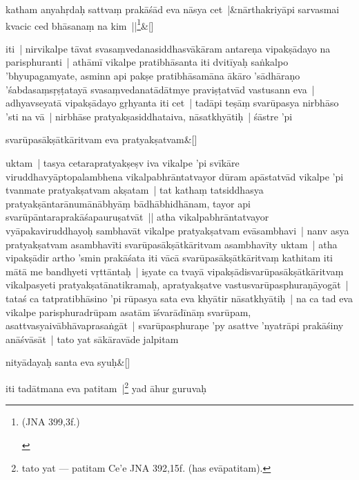 \documentclass[article,a4paper]{memoir}
\newcommand{\name}[1]{#1}
\begin{document}
	    
	    \stanza[\smallbreak]
katham anyahṛdaḥ sattvaṃ prakā\-śā\-d eva nā\-sya cet |&nā\-rthakriyā\-pi sarvasmai kvacic ced bhā\-sanaṃ na kim ||\footnote{\label{RNA-n-1}  \begin{english}(JNA 399,3f.)\end{english}}\&[\smallbreak]


	

	  \pstart iti | nirvikalpe tā\-vat svasaṃvedanasiddhasvā\-kā\-ram antareṇa vipakṣā\-dayo na parisphuranti | athā\-mī\- vikalpe pratibhā\-santa iti dvitī\-yaḥ saṅkalpo 'bhyupagamyate, asminn api pakṣe pratibhā\-samā\-na ā\-kā\-ro 'sā\-dhā\-raṇo 'śabdasaṃsṛṣṭatayā\- svasaṃvedanatā\-dā\-tmye praviṣṭatvā\-d vastusann eva | \label{thakur75-132.32} adhyavseyatā\- vipakṣā\-dayo gṛhyanta iti cet | tadā\-pi teṣā\-ṃ svarū\-pasya nirbhā\-so 'sti na vā\- | nirbhā\-se pratyakṣasiddhataiva, nā\-satkhyā\-tiḥ | śā\-stre 'pi
	\pend
      
	    
	    \stanza[\smallbreak]
svarū\-pasā\-kṣā\-tkā\-ritvam eva pratyakṣatvam\&[\smallbreak]


	

	  \pstart uktam | tasya cetarapratyakṣeṣv iva vikalpe 'pi svī\-kā\-re viruddhavyā\-ptopalambhena vikalpabhrā\-ntatvayor dū\-ram apā\-statvā\-d vikalpe 'pi tvanmate pratyakṣatvam akṣatam | tat kathaṃ tatsiddhasya pratyakṣā\-ntarā\-numā\-nā\-bhyā\-ṃ bā\-dhā\-bhidhā\-nam, tayor api svarū\-pā\-ntaraprakā\-śapauruṣatvā\-t || \label{thakur75-133.5} atha vikalpabhrā\-ntatvayor vyā\-pakaviruddhayoḥ sambhavā\-t vikalpe pratyakṣatvam evā\-sambhavi | nanv asya pratyakṣatvam asambhavī\-ti svarū\-pasā\-kṣā\-tkā\-ritvam asambhavī\-ty uktam | atha vipakṣā\-dir artho 'smin prakā\-śata iti vā\-cā\- svarū\-pasā\-kṣā\-tkā\-ritvaṃ kathitam iti mā\-tā\- me bandhyeti vṛttā\-ntaḥ | iṣyate ca tvayā\- vipakṣā\-disvarū\-pasā\-kṣā\-tkā\-ritvaṃ vikalpasyeti pratyakṣatā\-natikramaḥ, apratyakṣatve vastusvarū\-pasphuraṇā\-yogā\-t | tataś ca tatpratibhā\-sino 'pi rū\-pasya sata eva khyā\-tir nā\-satkhyā\-tiḥ | na ca tad eva vikalpe parisphuradrū\-pam asatā\-m ī\-śvarā\-dī\-nā\-ṃ svarū\-pam, asattvasyaivā\-bhā\-vaprasaṅgā\-t | svarū\-pasphuraṇe 'py asattve 'nyatrā\-pi prakā\-śiny anā\-śvā\-sā\-t | tato yat sā\-kā\-ravā\-de jalpitam
	\pend
      
	    
	    \stanza[\smallbreak]
nityā\-dayaḥ santa eva syuḥ\&[\smallbreak]


	

	  \pstart iti tadā\-tmana eva patitam |\footnote{tato yat --- patitam Ce'e JNA 392,15f. (has evā\-patitam).} yad ā\-hur \name{guruvaḥ}
	\pend
      
\end{document}
